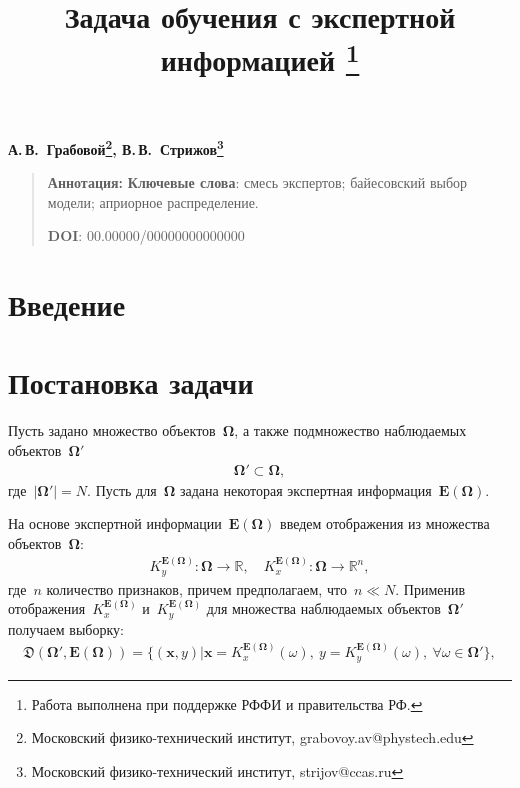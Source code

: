 \documentclass[12pt, twoside]{article}
\numberwithin{equation}{section}
\begin{document}
\title{\bf Задача обучения с экспертной информацией \thanks{Работа выполнена при поддержке РФФИ и правительства РФ.}}
\date{}
\author{}
\maketitle

\begin{center}
\bf
А.\,В.~Грабовой\footnote{Московский физико-технический институт, grabovoy.av@phystech.edu}, В.\,В.~Стрижов\footnote{Московский физико-технический институт, strijov@ccas.ru}

\end{center}

{\centering\begin{quote}
\textbf{Аннотация:} 
\smallskip
\textbf{Ключевые слова}: смесь экспертов; байесовский выбор модели; априорное распределение.

\smallskip
\textbf{DOI}: 00.00000/00000000000000
\end{quote}
}

\section{Введение}
\section{Постановка задачи}
Пусть задано множество объектов~$\bm{\Omega}$, а также подмножество наблюдаемых объектов~$\bm{\Omega}'$
\begin{equation}
\label{eq:st:1}
\begin{aligned}
\bm{\Omega}'\subset\bm{\Omega},
\end{aligned}
\end{equation}
где~$\left|\bm{\Omega}'\right|=N$.
Пусть для~$\bm{\Omega}$ задана некоторая экспертная информация~$\bm{E}\left(\bm{\Omega}\right)$.

На основе экспертной информации~$\bm{E}\left(\bm{\Omega}\right)$ введем отображения из множества объектов~$\bm{\Omega}$:
\begin{equation}
\label{eq:st:2}
\begin{aligned}
K_y^{\bm{E}\left(\bm{\Omega}\right)} :\bm{\Omega}\to \mathbb{R}, \quad K_x^{\bm{E}\left(\bm{\Omega}\right)} :\bm{\Omega}\to \mathbb{R}^{n},
\end{aligned}
\end{equation}
где~$n$ количество признаков, причем предполагаем, что~$n\ll N$. Применив отображения~$K_x^{\bm{E}\left(\bm{\Omega}\right)}$ и~$K_y^{\bm{E}\left(\bm{\Omega}\right)}$ для множества наблюдаемых объектов~$\bm{\Omega}'$ получаем выборку:
\begin{equation}
\label{eq:st:3}
\begin{aligned}
\mathfrak{D}\left(\bm{\Omega}',\bm{E}\left(\bm{\Omega}\right)\right) = \{\left(\textbf{x}, y\right)|\textbf{x}=K_x^{\bm{E}\left(\bm{\Omega}\right)}\left(\omega\right),~y=K_y^{\bm{E}\left(\bm{\Omega}\right)}\left(\omega\right),~\forall \omega \in \bm{\Omega}'\},
\end{aligned}
\end{equation}
\end{document}
